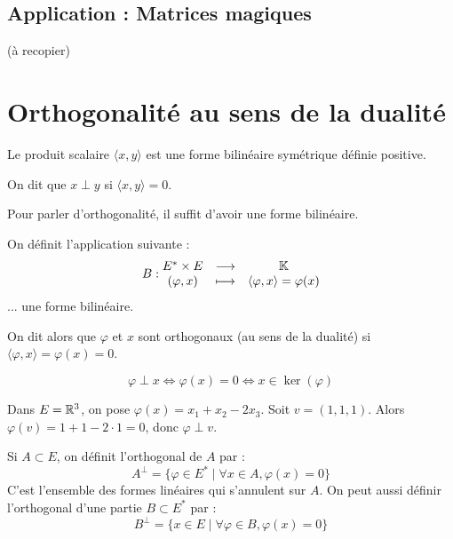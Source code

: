 \documentclass[11pt,a4paper]{report}
\begin{document}
\section{Application : Matrices magiques}

\begin{application}
    (à recopier)
\end{application}
\todo


\chapter{Orthogonalité au sens de la dualité}

\begin{rappel}
    Le produit scalaire $\langle x, y \rangle$ est une forme bilinéaire symétrique définie positive.

    On dit que $x \perp y$ si $\langle x, y \rangle = 0$.

    Pour parler d'orthogonalité, il suffit d'avoir une forme bilinéaire.
\end{rappel}

\begin{definition}
    On définit l'application suivante :
    $$B : \begin{matrix}
        E^* \times E & \longrightarrow & \mathbb{K} \\ (\varphi, x) & \longmapsto & \langle \varphi, x \rangle = \varphi(x)
    \end{matrix}$$
    ... une forme bilinéaire.

    On dit alors que $\varphi$ et $x$ sont orthogonaux (au sens de la dualité) si $\langle \varphi, x\rangle = \varphi(x) = 0$.

    $$\varphi \perp x \iff \varphi(x) = 0 \iff x \in \ker(\varphi)$$
\end{definition}

\begin{example}
    Dans $E = \mathbb{R}^3$, on pose $\varphi(x) = x_1 + x_2 - 2x_3$. Soit $v = (1,1,1)$. Alors $\varphi(v) = 1 + 1 - 2 \cdot 1 = 0$, donc $\varphi \perp v$.
\end{example}

\begin{definition}
    Si $A \subset E$, on définit l'orthogonal de $A$ par :
    $$A^\perp = \{\varphi \in E^* \mid \forall x \in A, \varphi(x) = 0\}$$
    C'est l'ensemble des formes linéaires qui s'annulent sur $A$.
    On peut aussi définir l'orthogonal d'une partie $B \subset E^*$ par :
    $$B^\perp = \{x \in E \mid \forall \varphi \in B, \varphi(x) = 0\}$$
\end{definition}
\end{document}
